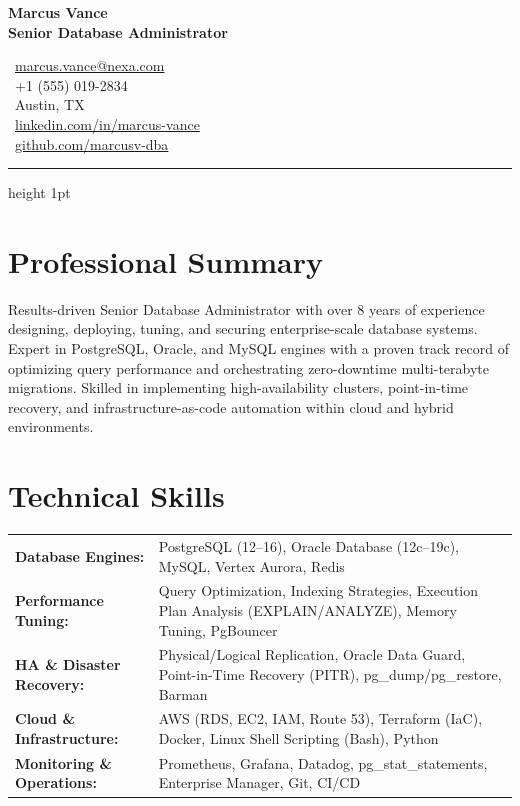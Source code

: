 \documentclass[10pt]{article}
\begin{document}
\begin{minipage}[t]{0.6\textwidth}
    {\Huge\bfseries\color{primary} Marcus Vance} \\[0.25em]
    {\large\bfseries\color{secondary} Senior Database Administrator}
\end{minipage}\hfill
\begin{minipage}[t]{0.38\textwidth}
    \raggedleft
    \small
    \faEnvelope\ \href{mailto:marcus.vance@nexa.com}{marcus.vance@nexa.com} \\
    \faPhone\ +1 (555) 019-2834 \\
    \faMapMarker\ Austin, TX \\
    \faLinkedin\ \href{https://linkedin.com/in/marcus-vance}{linkedin.com/in/marcus-vance} \\
    \faGithub\ \href{https://github.com/marcusv-dba}{github.com/marcusv-dba}
\end{minipage}

\vspace{0.2em}
\hrule height 1pt
\vspace{0.3em}

\section*{Professional Summary}
Results-driven Senior Database Administrator with over 8 years of experience designing, deploying, tuning, and securing enterprise-scale database systems. Expert in PostgreSQL, Oracle, and MySQL engines with a proven track record of optimizing query performance and orchestrating zero-downtime multi-terabyte migrations. Skilled in implementing high-availability clusters, point-in-time recovery, and infrastructure-as-code automation within cloud and hybrid environments.

\section*{Technical Skills}
\begingroup
\renewcommand{\arraystretch}{1.15}
\small
\begin{tabularx}{\textwidth}{@{}l X@{}}
    \textbf{Database Engines:} & PostgreSQL (12--16), Oracle Database (12c--19c), MySQL, Vertex Aurora, Redis \\
    \textbf{Performance Tuning:} & Query Optimization, Indexing Strategies, Execution Plan Analysis (EXPLAIN/ANALYZE), Memory Tuning, PgBouncer \\
    \textbf{HA \& Disaster Recovery:} & Physical/Logical Replication, Oracle Data Guard, Point-in-Time Recovery (PITR), pg\_dump/pg\_restore, Barman \\
    \textbf{Cloud \& Infrastructure:} & AWS (RDS, EC2, IAM, Route 53), Terraform (IaC), Docker, Linux Shell Scripting (Bash), Python \\
    \textbf{Monitoring \& Operations:} & Prometheus, Grafana, Datadog, pg\_stat\_statements, Enterprise Manager, Git, CI/CD \\
\end{tabularx}
\endgroup
\end{document}

